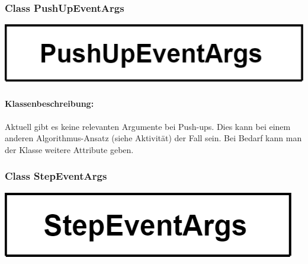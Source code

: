 \documentclass[a4paper,12pt]{article}
\begin{document}
	
	\begin{minipage}[b]{0.6\textwidth}
		\subsubsection{Class PushUpEventArgs}
		\end{minipage}
		\begin{minipage}[c]{0.5\textwidth}
			\includegraphics{bilder/EMKlassen/PushUpEventArgsClass.png}
		\end{minipage}
	\paragraph{Klassenbeschreibung:}
	Aktuell gibt es keine relevanten Argumente bei Push-ups. Dies kann bei einem anderen Algorithmus-Ansatz (siehe Aktivität) der Fall sein. Bei Bedarf kann man der Klasse weitere Attribute geben.\\
	
	\begin{minipage}[b]{0.6\textwidth}
		\subsubsection{Class StepEventArgs}
		\end{minipage}
		\begin{minipage}[c]{0.5\textwidth}
			\includegraphics{bilder/EMKlassen/StepEventArgsClass.png}
		\end{minipage}
\end{document}
